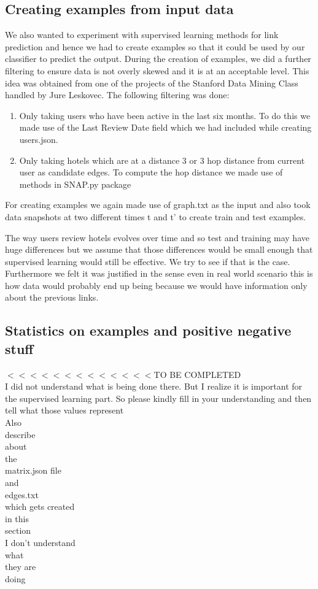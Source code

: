 \documentclass[letterpaper,twocolumn,11pt]{article}
\begin{document}
\subsection{Creating examples from input data}

We also wanted to experiment with supervised learning methods for link prediction and hence we had to create examples so that it could be used by our classifier to predict the output. During the creation of examples, we did a further filtering to ensure data is not overly skewed and it is at an acceptable level. This idea was obtained from one of the projects of the Stanford Data Mining Class handled by Jure Leskovec. The following filtering was done:

\begin{enumerate}
\item Only taking users who have been active in the last six months. To do this we made use of the Last Review Date field which we had included while creating users.json.

\item Only taking hotels which are at a distance 3 or 3 hop distance from current user as candidate edges. To compute the hop distance we made use of methods in SNAP.py package
\end{enumerate}

For creating examples we again made use of graph.txt as the input and also took data snapshots at two different times t and t' to create train and test examples.

The way users review hotels evolves over time and so test and training may have huge differences but we assume that those differences would be small enough that supervised learning would still be effective. We try to see if that is the case. Furthermore we felt it was justified in the sense even in real world scenario this is how data would probably end up being because we would have information only about the previous links.

\subsection { Statistics on examples and positive negative stuff}

$<<<<<<<<<<<<< $TO BE COMPLETED \\
I did not understand what is being done there. But I realize it is important for the supervised learning part. So please kindly fill in your understanding and then tell what those values represent \\
Also\\
describe\\
about \\
the\\
matrix.json file\\
and \\
edges.txt\\
which gets created\\
in this \\
section\\
I don't understand \\
what \\
they are\\
doing\\
\end{document}
